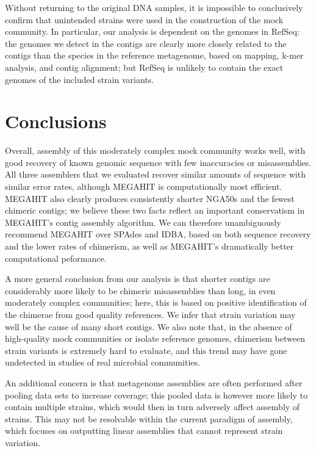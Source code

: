 \documentclass[10pt,a4paper,twocolumn]{article}
\begin{document}
Without returning to the original DNA samples, it is impossible to
conclusively confirm that unintended strains were used in the
construction of the mock community.  In particular, our analysis is
dependent on the genomes in RefSeq: the genomes we detect in the
contigs are clearly more closely related to the contigs than the
species in the reference metagenome, based on mapping, k-mer analysis,
and contig alignment; but RefSeq is unlikely to contain the exact
genomes of the included strain variants.


\section*{Conclusions}

Overall, assembly of this moderately complex mock community works
well, with good recovery of known genomic sequence with few
inaccuracies or misassemblies.  All three assemblers that we evaluated
recover similar amounts of sequence with similar error rates, although
MEGAHIT is computationally most efficient.  MEGAHIT also clearly
produces consistently shorter NGA50s and the fewest chimeric contigs;
we believe these two facts reflect an important conservatism in
MEGAHIT's contig assembly algorithm.  We can therefore unambiguously
recommend MEGAHIT over SPAdes and IDBA, based on both sequence
recovery and the lower rates of chimerism, as well as MEGAHIT's dramatically
better computational peformance.

A more general conclusion from our analysis is that shorter contigs
are considerably more likely to be chimeric misassemblies than long,
in even moderately complex communities; here, this is based on positive
identification of the chimerae from good quality references.  We infer
that strain variation may well be the cause of many short contigs. We
also note that, in the absence of high-quality mock communities or
isolate reference genomes, chimerism between strain variants is
extremely hard to evaluate, and this trend may have gone undetected in
studies of real microbial communities.

An additional concern is that metagenome assemblies are often
performed after pooling data sets to increase coverage; this pooled
data is however more likely to contain multiple strains, which would
then in turn adversely affect assembly of strains.  This may not be
resolvable within the current paradigm of assembly, which focuses on
outputting linear assemblies that cannot represent strain variation.
\end{document}
